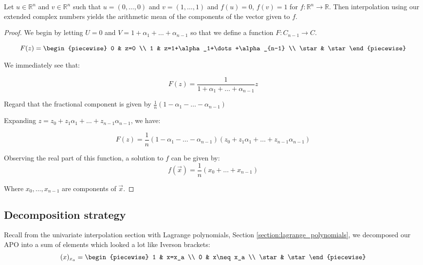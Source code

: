 \begin{example}
    Let $u\in\mathbb{R}^n$ and $v\in\mathbb{R}^n$ such that $u=(0,\dots,0)$ and $v=(1,\dots,1)$ and $f(u)=0$, $f(v)=1$ for $f:\mathbb{R}^n\to\mathbb{R}$. Then interpolation using our extended complex numbers yields the arithmetic mean of the components of the vector given to $f$.

    \begin{proof}
        We begin by letting $U=0$ and $V=1+\alpha_1+\dots+\alpha_{n-1}$ so that we define a function $F:C_{n-1}\to C$.

        $$
            F(z) = \begin{piecewise}
                0 & z=0 \\
                1 & z=1+\alpha_1+\dots+\alpha_{n-1} \\
                \star & \star
            \end{piecewise}
        $$

        We immediately see that:

        $$
            F(z)=\frac{1}{1+\alpha_1+\dots+\alpha_{n-1}}z
        $$

        Regard that the fractional component is given by $\frac{1}{n}(1-\alpha_1-\dots-\alpha_{n-1})$

        Expanding $z=z_0+z_1\alpha_1+\dots+z_{n-1}\alpha_{n-1}$, we have:

        $$
            F(z)=\frac{1}{n}(1-\alpha_1-\dots-\alpha_{n-1})(z_0+z_1\alpha_1+\dots+z_{n-1}\alpha_{n-1})
        $$

        Observing the real part of this function, a solution to $f$ can be given by:
        $$
            f(\vec{x})=\frac{1}{n}(x_0+\dots+x_{n-1})
        $$

        Where $x_0,\dots,x_{n-1}$ are components of $\vec{x}$.
    \end{proof}
\end{example}

\subsection{Decomposition strategy}
Recall from the univariate interpolation section with Lagrange polynomials, Section \ref{section:lagrange_polynomials}, we decomposed our APO into a sum of elements which looked a lot like Iverson brackets:
$$
    (x)_{x_a}=\begin{piecewise}
        1 & x=x_a \\
        0 & x\neq x_a \\
        \star & \star
    \end{piecewise}
$$

